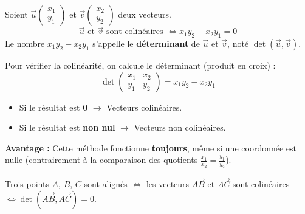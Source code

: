 \documentclass[11pt]{article}
\begin{document}
\begin{propriete}
    Soient $\vec{u}\begin{pmatrix} x_1 \\ y_1 \end{pmatrix}$ et $\vec{v}\begin{pmatrix} x_2 \\ y_2 \end{pmatrix}$ deux vecteurs.
    \[
    \vec{u} \text{ et } \vec{v} \text{ sont colinéaires } \iff x_1y_2 - x_2y_1 = 0
    \]
    Le nombre $x_1y_2 - x_2y_1$ s'appelle le \textbf{déterminant} de $\vec{u}$ et $\vec{v}$, noté $\det(\vec{u},\vec{v})$.
\end{propriete}

\begin{aretenir}
    Pour vérifier la colinéarité, on calcule le déterminant (produit en croix) :
    \[
    \det\begin{pmatrix} x_1 & x_2 \\ y_1 & y_2 \end{pmatrix} = x_1y_2 - x_2y_1
    \]
    \begin{itemize}
        \item Si le résultat est \textbf{0} $\to$ Vecteurs colinéaires.
        \item Si le résultat est \textbf{non nul} $\to$ Vecteurs non colinéaires.
    \end{itemize}
    \textbf{Avantage :} Cette méthode fonctionne \textbf{toujours}, même si une coordonnée est nulle (contrairement à la comparaison des quotients $\frac{x_1}{x_2}=\frac{y_1}{y_2}$).
\end{aretenir}

\begin{propriete}
    Trois points $A$, $B$, $C$ sont alignés $\iff$ les vecteurs $\overrightarrow{AB}$ et $\overrightarrow{AC}$ sont colinéaires $\iff \det(\overrightarrow{AB},\overrightarrow{AC})=0$.
\end{propriete}
\end{document}
